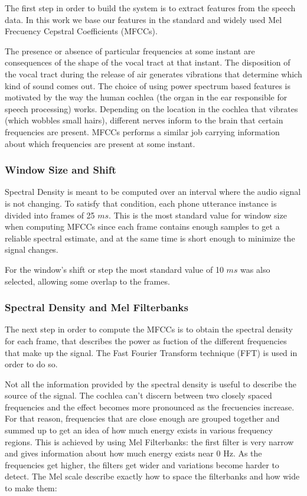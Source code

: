 The first step in order to build the system is to extract features from the speech data. In this
work we base our features in the standard and widely used Mel Frecuency Cepstral Coefficients 
(MFCCs).

The presence or absence of particular frequencies at some instant are consequences of the shape of
the vocal tract at that instant. The disposition of the vocal tract during the 
release of air generates vibrations 
that determine which kind of sound comes out.
The choice of using power spectrum based features is motivated by
the way the human cochlea (the organ in the ear responsible for speech processing) works.
Depending on the location in the cochlea that vibrates (which wobbles small hairs), 
different nerves inform to the brain that certain frequencies are present. 
MFCCs performs a similar job carrying information about which frequencies are present at
some instant. 


\subsubsection{Window Size and Shift}

Spectral Density is meant to be computed over an interval where the audio signal is not changing.
To satisfy that condition, each phone utterance instance is divided into frames of 25 $ms$. 
This is the most standard value for window size when computing MFCCs since 
each frame contains enough samples to get a reliable spectral estimate, and at the same time is
short enough to minimize the signal changes.

For the window's shift or step the most standard value of 10 $ms$ was also selected, allowing some
overlap to the frames.


\subsubsection{Spectral Density and Mel Filterbanks}

The next step in order to compute the MFCCs is to obtain the spectral density for each frame,
that describes the power as fuction of the different frequencies that make up the signal.
The Fast Fourier Transform technique (FFT) is used in order to do so. 

Not all the information provided by the spectral density is useful to describe the source
of the signal. The cochlea can't discern between two closely spaced frequencies and the
effect becomes more pronounced as the frecuencies increase. For that reason, frequencies
that are close enough are grouped together and summed up to get an idea of how much energy
exists in various frequency regions. This is achieved by using Mel Filterbanks: 
the first filter is very narrow and gives information about how much energy exists near 0 Hz.
As the frequencies get higher, the filters get wider and variations become harder to 
detect. The Mel scale describe exactly how to space the filterbanks and how wide to make them:

